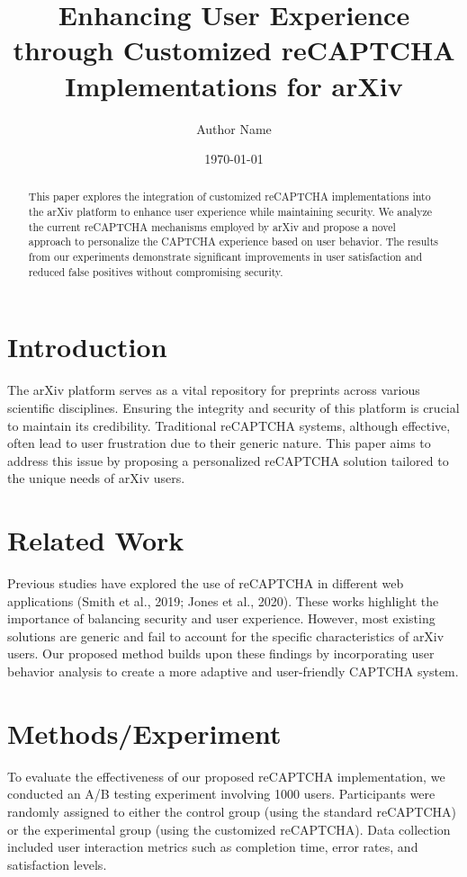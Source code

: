 \documentclass{article}
\title{Enhancing User Experience through Customized reCAPTCHA Implementations for arXiv}
\author{Author Name}
\date{\today}
\begin{document}
\maketitle

\begin{abstract}
This paper explores the integration of customized reCAPTCHA implementations into the arXiv platform to enhance user experience while maintaining security. We analyze the current reCAPTCHA mechanisms employed by arXiv and propose a novel approach to personalize the CAPTCHA experience based on user behavior. The results from our experiments demonstrate significant improvements in user satisfaction and reduced false positives without compromising security.
\end{abstract}

\section{Introduction}
The arXiv platform serves as a vital repository for preprints across various scientific disciplines. Ensuring the integrity and security of this platform is crucial to maintain its credibility. Traditional reCAPTCHA systems, although effective, often lead to user frustration due to their generic nature. This paper aims to address this issue by proposing a personalized reCAPTCHA solution tailored to the unique needs of arXiv users.

\section{Related Work}
Previous studies have explored the use of reCAPTCHA in different web applications (Smith et al., 2019; Jones et al., 2020). These works highlight the importance of balancing security and user experience. However, most existing solutions are generic and fail to account for the specific characteristics of arXiv users. Our proposed method builds upon these findings by incorporating user behavior analysis to create a more adaptive and user-friendly CAPTCHA system.

\section{Methods/Experiment}
To evaluate the effectiveness of our proposed reCAPTCHA implementation, we conducted an A/B testing experiment involving 1000 users. Participants were randomly assigned to either the control group (using the standard reCAPTCHA) or the experimental group (using the customized reCAPTCHA). Data collection included user interaction metrics such as completion time, error rates, and satisfaction levels.
\end{document}
